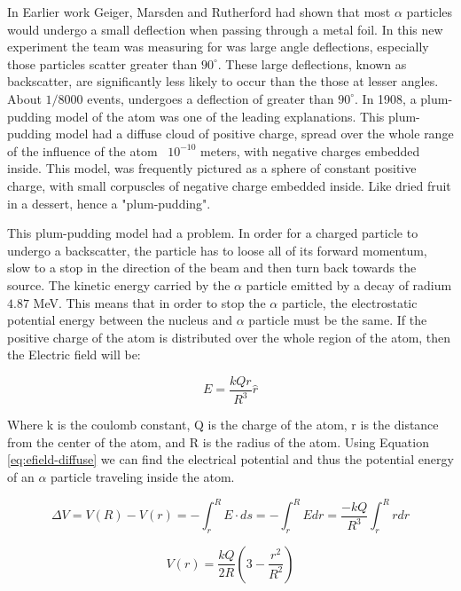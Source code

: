 \documentclass[12pt]{article}
\begin{document}
In Earlier work Geiger, Marsden and Rutherford had shown that most $\alpha$ particles would undergo a small deflection when passing through a metal foil\cite{Geiger1908}. In this new experiment the team was measuring for was large angle deflections, especially those particles scatter greater than $90^\circ$.
These large deflections, known as backscatter, are significantly less likely to occur than the those at lesser angles.
About $1/8000$ events, undergoes a deflection of greater than $90^\circ$.
In 1908, a plum-pudding model of the atom was one of the leading explanations. 
This plum-pudding model had a diffuse cloud of positive charge, spread over the whole range of the influence of the atom ~$10^{-10}$ meters, with negative charges embedded inside.
This model, was frequently pictured as a sphere of constant positive charge, with small corpuscles of negative charge embedded inside. Like dried fruit in a dessert, hence a "plum-pudding".

This plum-pudding model had a problem.
In order for a charged particle to undergo a backscatter, the particle has to loose all of its forward momentum, slow to a stop in the direction of the beam and then turn back towards the source.
The kinetic energy carried by the $\alpha$ particle emitted by a decay of radium $4.87$ MeV.
This means that in order to stop the $\alpha$ particle, the electrostatic potential energy between the nucleus and $\alpha$ particle must be the same.
If the positive charge of the atom is distributed over the whole region of the atom, then the Electric field will be: 

\begin{equation}\label{eq:efield-diffuse}
    E = \frac{kQr}{R^3}\hat{r}
\end{equation}

Where k is the coulomb constant, Q is the charge of the atom, r is the distance from the center of the atom, and R is the radius of the atom. Using Equation \ref{eq:efield-diffuse} we can find the electrical potential and thus the potential energy of an $\alpha$ particle traveling inside the atom.

\begin{equation}
    \Delta{V} = V(R)-V(r) = -\int_r^RE\cdot{ds} = -\int_r^RE dr = \frac{-kQ}{R^3}\int_r^Rr dr
\end{equation}

\begin{equation}\label{eq:potential-diffuse}
    V(r) = \frac{kQ}{2R}(3-\frac{r^2}{R^2})
\end{equation}
\end{document}
